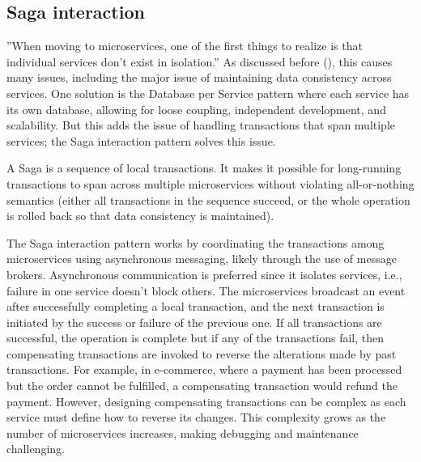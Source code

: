 \documentclass[]{final}
\begin{document}
\subsection{Saga interaction}

”When moving to microservices, one of the first things to realize is that
individual services don’t exist in isolation.” As discussed
before {\hypersetup{linkcolor=teal}(\pageref{microservice_issue})}, this causes
many issues, including the major issue of maintaining data consistency across
services. One solution is the Database per Service pattern where each service
has its own database, allowing for loose coupling, independent development,
and scalability. But this adds the issue of handling transactions that span
multiple services; the Saga interaction pattern solves this issue.

A Saga is a sequence of local transactions. %
It makes it possible for long-running transactions to span across multiple
microservices without violating all-or-nothing semantics (either all
transactions in the sequence succeed, or the whole operation is rolled back
so that data consistency is maintained).%

\label{saga_events}
The Saga interaction pattern works by coordinating the transactions among
microservices using asynchronous messaging, likely through the use of message
brokers. Asynchronous communication is preferred since it isolates services,
i.e., failure in one service doesn't block others. %
The microservices
broadcast an event after successfully completing a local transaction, and
the next transaction is initiated by the success or failure of the
previous one. If all transactions are successful, the operation is complete
but if any of the transactions fail, then compensating transactions are
invoked to reverse the alterations made by past transactions. %
For example, in e-commerce, where a payment has been processed but the order
cannot be fulfilled, a compensating transaction would refund the payment.
However, designing compensating transactions can be complex as each service
must define how to reverse its changes. This complexity grows as the number
of microservices increases, making debugging and maintenance challenging.
\end{document}
